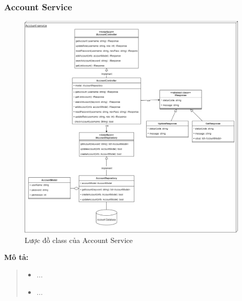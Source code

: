 \subsubsection{Account Service}
\begin{figure}[!htp]
	\centering
	\includegraphics[width=11cm]{img/Architecture/service/AccountService.png}
	\newline
	\caption{Lược đồ class của Account Service}
\end{figure}
\textbf{Mô tả:}
\begin{quote}
	\begin{itemize}
		\item ...
		\item ...
	\end{itemize}
\end{quote}


